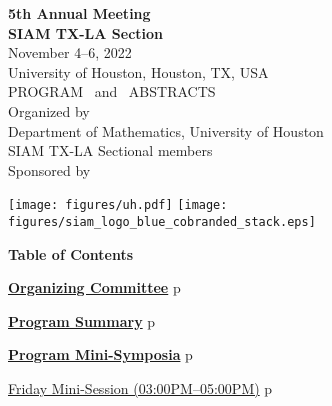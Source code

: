 \thispagestyle{empty}
\vspace*{4ex}

{\center
{\LARGE \bf 5th Annual Meeting}\\  [8mm]
{\Huge \bf SIAM TX-LA Section} \\ [8mm]

{\Large November 4--6, 2022} \\[3mm]
{\Large University of Houston, Houston, TX, USA} \\[36mm]

{\LARGE PROGRAM \ and \ ABSTRACTS}  \\ [32mm]


{\large Organized by} \\ [3mm]
{\Large Department of  Mathematics, University of Houston\\
\vspace{5pt} SIAM TX-LA Sectional members} \\ [16mm]


{\large Sponsored by}\\[3mm]
\begin{center}
\texttt{[image: figures/uh.pdf]}
\qquad\texttt{[image: figures/siam\_logo\_blue\_cobranded\_stack.eps]}
\end{center}
}

\newpage\newpage
\thispagestyle{empty}
\newpage
\clearpage


\thispagestyle{empty}
\centerline{\bfseries\Large Table of Contents}
\vspace{4ex}

\noindent
\hyperref[committee]{{\bfseries\large  Organizing Committee}}%
\dotfill{}p\pageref{committee}
\vspace{3ex}

\noindent
\hyperref[programsummary]{{\bfseries\large  Program Summary}}%
\dotfill{}p\pageref{programsummary}
\vspace{3ex}

\noindent
\hyperref[program]{{\bfseries\large  Program Mini-Symposia}}%
\dotfill{}p\pageref{program}
\vspace{2ex}

\noindent\quad\hyperref[mini-friday]{{\large Friday Mini-Session (03:00PM--05:00PM)}}%
\dotfill{}p\pageref{mini-friday}
\vspace{2ex}

